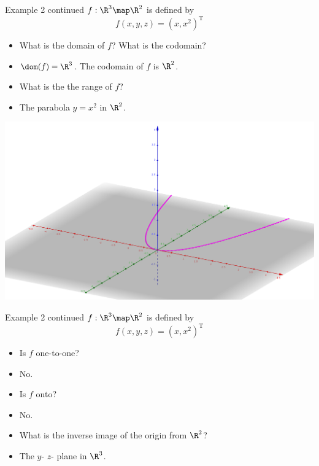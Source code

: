 \documentclass{beamer}
\begin{document}
\begin{frame}{Example 2 continued}
$f:\R^3\map\R^2$ is defined by
$$f(x,y,z) = (x, x^2)^{\text{T}}$$
\begin{itemize}
\item What is the domain of $f$? What is the codomain?
\item $\dom(f) =\R^3$. The codomain of $f$ is $\R^2$.
\item What is the the range of $f$?
\item The parabola $y=x^2$ in  $\R^2$.
\end{itemize}
\pause
\includegraphics[scale=0.1]{project-to-parabola}
\end{frame}


\begin{frame}{Example 2 continued}
$f:\R^3\map\R^2$ is defined by
$$f(x,y,z) = (x, x^2)^{\text{T}}$$
\begin{itemize}
\item Is $f$ one-to-one?
\item No.
\item Is $f$ onto?
\item No.
\item What is the inverse image of the origin from $\R^2$?
\item The $y$- $z$- plane in $\R^3$.
\end{itemize}
\end{frame}
\end{document}
